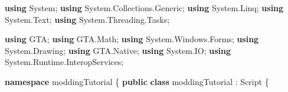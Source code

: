 \documentclass[
  openany]{book}
\newenvironment{Shaded}{\begin{snugshade}}{\end{snugshade}}
\newcommand{\FunctionTok}[1]{\textcolor[rgb]{0.00,0.00,0.00}{#1}}
\newcommand{\KeywordTok}[1]{\textcolor[rgb]{0.13,0.29,0.53}{\textbf{#1}}}
\newcommand{\NormalTok}[1]{#1}
\begin{document}
\begin{Shaded}
\begin{Highlighting}[]
\KeywordTok{using}\NormalTok{ System;}
\KeywordTok{using}\NormalTok{ System.}\FunctionTok{Collections}\NormalTok{.}\FunctionTok{Generic}\NormalTok{;}
\KeywordTok{using}\NormalTok{ System.}\FunctionTok{Linq}\NormalTok{;}
\KeywordTok{using}\NormalTok{ System.}\FunctionTok{Text}\NormalTok{;}
\KeywordTok{using}\NormalTok{ System.}\FunctionTok{Threading}\NormalTok{.}\FunctionTok{Tasks}\NormalTok{;}

\KeywordTok{using}\NormalTok{ GTA;}
\KeywordTok{using}\NormalTok{ GTA.}\FunctionTok{Math}\NormalTok{;}
\KeywordTok{using}\NormalTok{ System.}\FunctionTok{Windows}\NormalTok{.}\FunctionTok{Forms}\NormalTok{;}
\KeywordTok{using}\NormalTok{ System.}\FunctionTok{Drawing}\NormalTok{;}
\KeywordTok{using}\NormalTok{ GTA.}\FunctionTok{Native}\NormalTok{;}
\KeywordTok{using}\NormalTok{ System.}\FunctionTok{IO}\NormalTok{;}
\KeywordTok{using}\NormalTok{ System.}\FunctionTok{Runtime}\NormalTok{.}\FunctionTok{InteropServices}\NormalTok{;}

\KeywordTok{namespace}\NormalTok{ moddingTutorial}
\NormalTok{\{}
    \KeywordTok{public} \KeywordTok{class}\NormalTok{ moddingTutorial : Script}
\NormalTok{    \{}
  

\end{Highlighting}
\end{Shaded}
\end{document}

